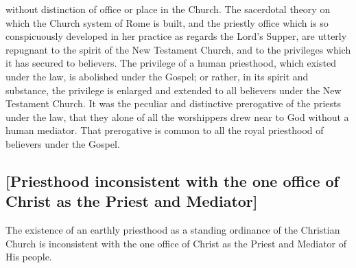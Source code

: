 \documentclass[
  english,
]{book}
\begin{document}
without distinction of office or place in the Church. The sacerdotal theory on which the Church system of Rome is built, and the priestly office which is so conspicuously developed in her practice as regards the Lord's Supper, are utterly repugnant to the spirit of the New Testament Church, and to the privileges which it has secured to believers. The privilege of a human priesthood, which existed under the law, is abolished under the Gospel; or rather, in its spirit and substance, the privilege is enlarged and extended to all believers under the New Testament Church. It was the peculiar and distinctive prerogative of the priests under the law, that they alone of all the worshippers drew near to God without a human mediator. That prerogative is common to all the royal priesthood of believers under the Gospel.

\hypertarget{priesthood-inconsistent-with-the-one-office-of-christ-as-the-priest-and-mediator}{%
\subsection{{[}Priesthood inconsistent with the one office of Christ as the Priest and Mediator{]}}\label{priesthood-inconsistent-with-the-one-office-of-christ-as-the-priest-and-mediator}}

The existence of an earthly priesthood as a standing ordinance of the Christian Church is inconsistent with the one office of Christ as the Priest and Mediator of His people.
\end{document}
